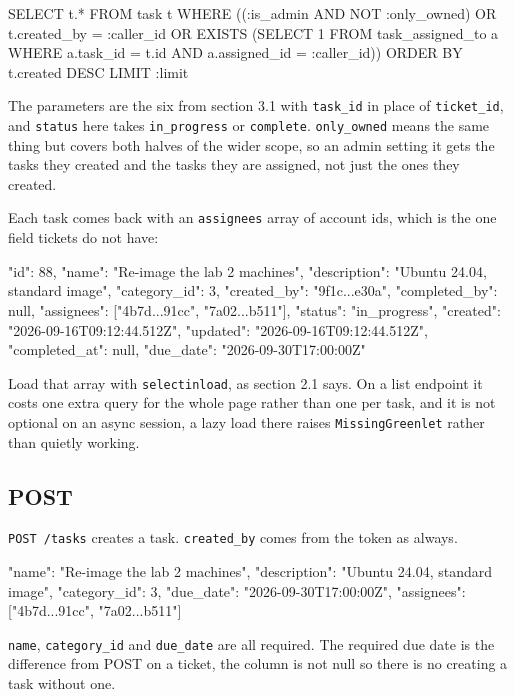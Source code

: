 \documentclass[12pt,letterpaper]{article}
\begin{document}
\begin{code}
SELECT t.* FROM task t
 WHERE ((:is_admin AND NOT :only_owned)
        OR t.created_by = :caller_id
        OR EXISTS (SELECT 1
                     FROM task_assigned_to a
                    WHERE a.task_id = t.id
                      AND a.assigned_id = :caller_id))
 ORDER BY t.created DESC
 LIMIT :limit
\end{code}

The parameters are the six from section 3.1 with \texttt{task\_id} in place of
\texttt{ticket\_id}, and \texttt{status} here takes \texttt{in\_progress} or
\texttt{complete}. \texttt{only\_owned} means the same thing but covers both
halves of the wider scope, so an admin setting it gets the tasks they created
and the tasks they are assigned, not just the ones they created.

Each task comes back with an \texttt{assignees} array of account ids, which is
the one field tickets do not have:

\begin{code}
{
  "id": 88,
  "name": "Re-image the lab 2 machines",
  "description": "Ubuntu 24.04, standard image",
  "category_id": 3,
  "created_by": "9f1c...e30a",
  "completed_by": null,
  "assignees": ["4b7d...91cc", "7a02...b511"],
  "status": "in_progress",
  "created": "2026-09-16T09:12:44.512Z",
  "updated": "2026-09-16T09:12:44.512Z",
  "completed_at": null,
  "due_date": "2026-09-30T17:00:00Z"
}
\end{code}

Load that array with \texttt{selectinload}, as section 2.1 says. On a list
endpoint it costs one extra query for the whole page rather than one per task,
and it is not optional on an async session, a lazy load there raises
\texttt{MissingGreenlet} rather than quietly working.

\subsection{POST}

\texttt{POST /tasks} creates a task. \texttt{created\_by} comes from the token
as always.

\begin{code}
{
  "name": "Re-image the lab 2 machines",
  "description": "Ubuntu 24.04, standard image",
  "category_id": 3,
  "due_date": "2026-09-30T17:00:00Z",
  "assignees": ["4b7d...91cc", "7a02...b511"]
}
\end{code}

\texttt{name}, \texttt{category\_id} and \texttt{due\_date} are all required.
The required due date is the difference from POST on a ticket, the column is not
null so there is no creating a task without one.
\end{document}
